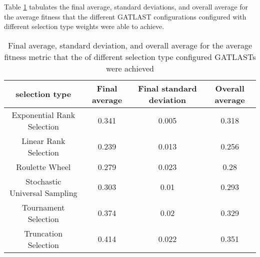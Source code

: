Table \ref{tab:HP:GA:selectionMethod:average fitness} tabulates the final average, standard deviations, and overall average for the average fitness that the different GATLAST configurations configured with different selection type weights were able to achieve.
\begin{table}[tbh!]
\centering
\begin{adjustbox}{trim=0cm 0cm 0cm 0cm, clip=true}
\begin{tabular}{|c|c|c|c|}
\hline
selection type & Final average & Final standard deviation & Overall average\\
\hline
Exponential Rank Selection & 0.341 & 0.005 & 0.318\\\hline
Linear Rank Selection & 0.239 & 0.013 & 0.256\\\hline
Roulette Wheel & 0.279 & 0.023 & 0.28\\\hline
Stochastic Universal Sampling & 0.303 & 0.01 & 0.293\\\hline
Tournament Selection & 0.374 & 0.02 & 0.329\\\hline
Truncation Selection & 0.414 & 0.022 & 0.351\\\hline
\end{tabular}
\end{adjustbox}
\caption{Final average, standard deviation, and overall average for the average fitness metric that the of different selection type configured GATLASTs were achieved}
\label{tab:HP:GA:selectionMethod:average fitness}
\end{table}